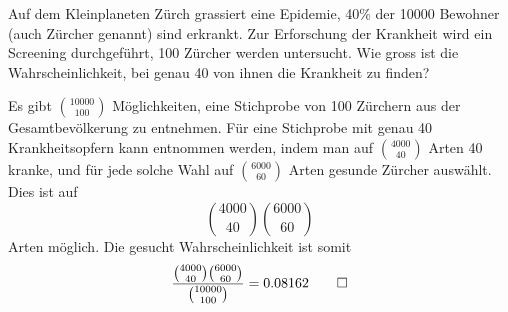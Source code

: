 Auf dem Kleinplaneten Zürch grassiert eine Epidemie, 40\% der 10000 Bewohner
(auch Zürcher genannt) sind
erkrankt. Zur Erforschung der Krankheit wird ein Screening durchgeführt,
100 Zürcher werden untersucht. Wie gross ist die Wahrscheinlichkeit,
bei genau 40 von ihnen die Krankheit zu finden?


\begin{loesung}
Es gibt $\binom{10000}{100}$ Möglichkeiten, eine Stichprobe von
100 Zürchern aus der Gesamtbevölkerung zu entnehmen. Für eine
Stichprobe mit genau 40 Krankheitsopfern kann entnommen
werden, indem man auf
$\binom{4000}{40}$ Arten 40 kranke, und für jede solche Wahl
auf $\binom{6000}{60}$ Arten
gesunde Zürcher auswählt. Dies ist auf
\[
\binom{4000}{40}\binom{6000}{60}
\]
Arten möglich.
Die gesucht Wahrscheinlichkeit ist somit
\[
\frac{\binom{4000}{40}\binom{6000}{60}}{\binom{10000}{100}}=
0.08162
\qedhere
\]
\end{loesung}

